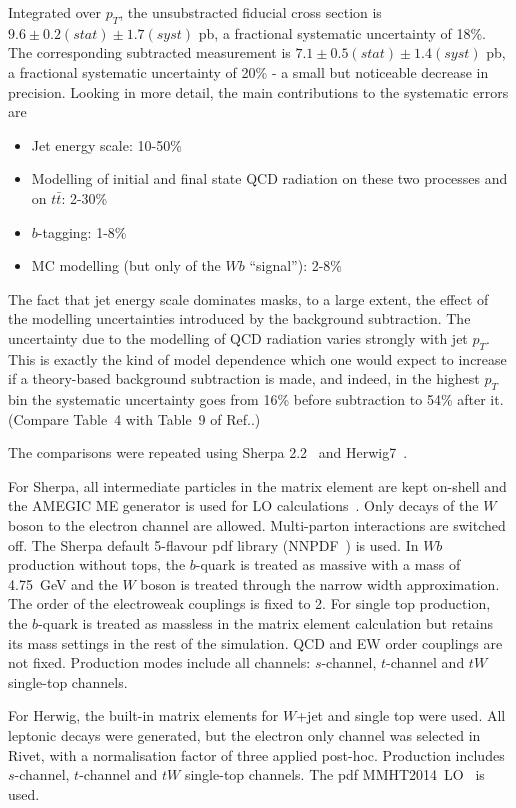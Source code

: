 \documentclass[11pt]{cernrep}
\begin{document}
Integrated over $p_T$, the unsubstracted fiducial cross section is
$9.6 \pm 0.2 (stat) \pm 1.7 (syst)$ pb, a fractional systematic uncertainty of 18\%.
The corresponding subtracted measurement is 
$7.1 \pm 0.5 (stat) \pm 1.4 (syst)$ pb, a fractional systematic uncertainty of 20\%
- a small but noticeable decrease in precision. Looking in more detail, the main contributions 
to the systematic errors are
\begin{itemize}
\item Jet energy scale: 10-50\%
\item Modelling of initial and final state QCD radiation on these two processes and on $t\bar{t}$: 2-30\%
\item $b$-tagging: 1-8\%
\item MC modelling (but only of the $Wb$ “signal”): 2-8\%
\end{itemize}
The fact that jet energy scale dominates masks, to a large extent, the effect of the modelling uncertainties introduced by
the background subtraction.
The uncertainty due to the modelling of QCD radiation varies strongly with jet $p_T$. 
This is exactly the kind of model dependence which one would expect to increase if a theory-based background
subtraction is made, and indeed, in the highest $p_T$ bin the systematic uncertainty goes from 16\% before subtraction 
to 54\% after it. (Compare Table~4 with Table~9 of Ref.\cite{Aad:2013vka}.) 

The comparisons were repeated using Sherpa 2.2~\cite{Gleisberg:2008ta} and Herwig7~\cite{Bellm:2015jjp}. 

For Sherpa, all intermediate particles in the matrix element are kept on-shell and the AMEGIC 
ME generator is used for LO calculations~\cite{Krauss:2001iv}. Only decays of the $W$ boson to the 
electron channel are allowed. Multi-parton interactions are switched off. 
The Sherpa default 5-flavour pdf library (NNPDF~\cite{Ball:2014uwa}) is used. In $Wb$ production
without tops, the $b$-quark is treated as massive with a mass of
4.75~GeV and the $W$ boson is treated through the narrow width approximation. The order of the electroweak couplings is fixed to 2. 
For single top production, the $b$-quark is treated as massless in the matrix element calculation
but retains its mass settings in the rest of the simulation. QCD and EW order couplings are not
fixed. Production modes include all channels: $s$-channel, $t$-channel and $tW$ single-top channels.

For Herwig, the built-in matrix elements for $W$+jet and single top were used. All leptonic decays
were generated, but the electron only channel was selected in Rivet, with a normalisation factor
of three applied post-hoc. Production includes $s$-channel,
$t$-channel and $tW$ single-top channels. The pdf MMHT2014~LO~\cite{Harland-Lang:2014zoa} is used. 
\end{document}
